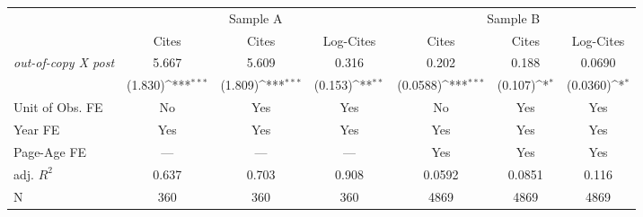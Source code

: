 {
\def\sym#1{\ifmmode^{#1}\else\(^{#1}\)\fi}
\begin{tabular*}{\hsize}{@{\hskip\tabcolsep\extracolsep\fill}l*{6}{c}}
\toprule
            &\multicolumn{3}{c}{Sample A}                                     &\multicolumn{3}{c}{Sample B}                                     \\\cmidrule(lr){2-4}\cmidrule(lr){5-7}
            &\multicolumn{1}{c}{Cites}&\multicolumn{1}{c}{Cites}&\multicolumn{1}{c}{Log-Cites}&\multicolumn{1}{c}{Cites}&\multicolumn{1}{c}{Cites}&\multicolumn{1}{c}{Log-Cites}\\
\midrule
\emph{out-of-copy X post}&       5.667         &       5.609         &       0.316         &       0.202         &       0.188         &      0.0690         \\
            &     (1.830)\sym{***}&     (1.809)\sym{***}&     (0.153)\sym{**} &    (0.0588)\sym{***}&     (0.107)\sym{*}  &    (0.0360)\sym{*}  \\
\midrule
Unit of Obs. FE&          No         &         Yes         &         Yes         &          No         &         Yes         &         Yes         \\
Year FE     &         Yes         &         Yes         &         Yes         &         Yes         &         Yes         &         Yes         \\
Page-Age FE &         ---         &         ---         &         ---         &         Yes         &         Yes         &         Yes         \\
adj. $R^2$  &       0.637         &       0.703         &       0.908         &      0.0592         &      0.0851         &       0.116         \\
N           &         360         &         360         &         360         &        4869         &        4869         &        4869         \\
\bottomrule
\end{tabular*}
}
